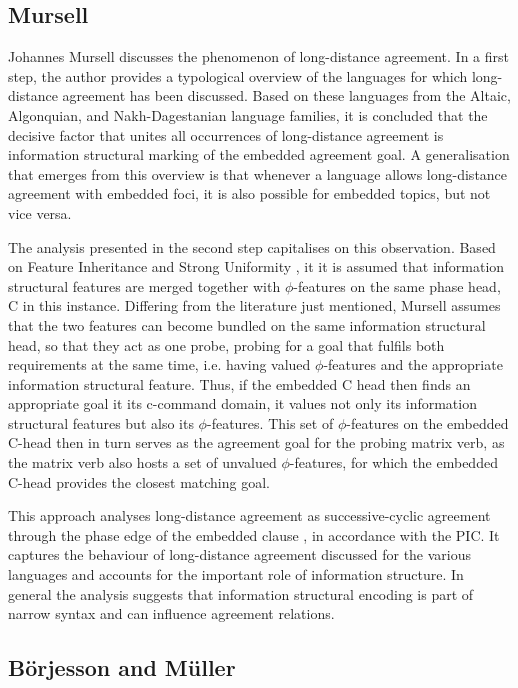 \documentclass[output=paper
,modfonts
,nonflat]{langsci/langscibook}
\begin{document}
\subsection{Mursell}
\label{sec:mursell}

Johannes Mursell discusses the phenomenon of long-distance agreement. In a first step, the author provides a typological overview of the languages for which long-distance agreement has been discussed. Based on these languages from the Altaic, Algonquian, and Nakh-Dagestanian language families, it is concluded that the decisive factor that unites all occurrences of long-distance agreement is information structural marking of the embedded agreement goal. A generalisation that emerges from this overview is that whenever a language allows long-distance agreement with embedded foci, it is also possible for embedded topics, but not vice versa.

The analysis presented in the second step capitalises on this observation. Based on Feature Inheritance \citep{Chomsky2008} and Strong Uniformity \citep{Miyagawa2010,Miyagawa2017}, it it is assumed that information structural features are merged together with $ \phi $-features on the same phase head, C in this instance. Differing from the literature just mentioned, Mursell assumes that the two features can become bundled on the same information structural head, so that they act as one probe, probing for a goal that fulfils both requirements at the same time, i.e. having valued $\phi$-features and the appropriate information structural feature. Thus, if the embedded C head then finds an appropriate goal it its c-command domain, it values not only its information structural features but also its $\phi$-features. This set of $\phi$-features on the embedded C-head then in turn serves as the agreement goal for the probing matrix verb, as the matrix verb also hosts a set of unvalued $\phi$-features, for which the embedded C-head provides the closest matching goal.

This approach analyses long-distance agreement as successive-cyclic agreement through the phase edge of the embedded clause \citep{Legate2005}, in accordance with the PIC. It captures the behaviour of long-distance agreement discussed for the various languages and accounts for the important role of information structure. In general the analysis suggests that information structural encoding is part of narrow syntax and can influence agreement relations.

\subsection{B\"{o}rjesson and M\"{u}ller}
\label{sec:boerjessonmueller}
\end{document}
